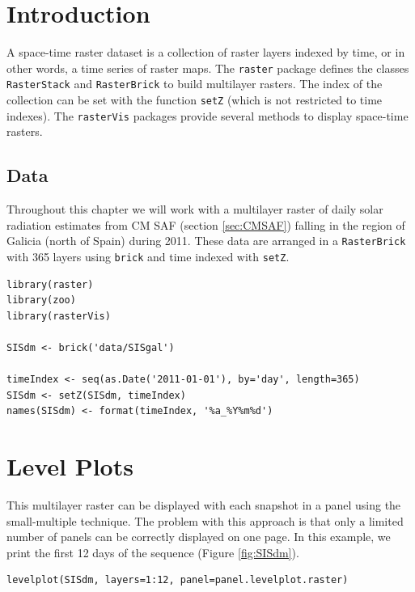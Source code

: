 
\section{Introduction}
\label{sec-1}

A space-time raster dataset is a collection of raster layers indexed
by time, or in other words, a time series of raster maps. The \texttt{raster}
package defines the classes \texttt{RasterStack} and \texttt{RasterBrick} to build
multilayer rasters. The index of the collection can be set with the
function \texttt{setZ} (which is not restricted to time indexes). The
\texttt{rasterVis} packages provide several methods to display space-time
rasters.

\subsection{Data}
\label{sec-1-1}
Throughout this chapter we will work with a multilayer raster of daily
solar radiation estimates from CM SAF (section \ref{sec:CMSAF}) falling in
the region of Galicia (north of Spain) during 2011. These data are
arranged in a \texttt{RasterBrick} with 365 layers using \texttt{brick} and time
indexed with \texttt{setZ}.


\lstset{language=R,numbers=none}
\begin{lstlisting}
library(raster)
library(zoo)
library(rasterVis)

SISdm <- brick('data/SISgal')

timeIndex <- seq(as.Date('2011-01-01'), by='day', length=365)
SISdm <- setZ(SISdm, timeIndex)
names(SISdm) <- format(timeIndex, '%a_%Y%m%d')
\end{lstlisting}
\section{Level Plots}
\label{sec-2}

This multilayer raster can be displayed with each snapshot in a
panel using the small-multiple technique. The problem with this
approach is that only a limited number of panels can be correctly
displayed on one page. In this example, we print the first 12
days of the sequence (Figure \ref{fig:SISdm}).


\lstset{language=R,numbers=none}
\begin{lstlisting}
levelplot(SISdm, layers=1:12, panel=panel.levelplot.raster)
\end{lstlisting}

